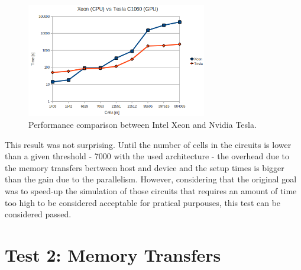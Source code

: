 \begin{figure}[h!bt]
	\centerline{\includegraphics[width=0.7\textwidth]{img/XeonVsTesla.png}}
	\caption{Performance comparison between Intel Xeon and Nvidia Tesla.}
	\label{fig:NvidiaGPUsLogicalOrg}
\end{figure}

This result was not surprising. Until the number of cells in the circuits is lower than a given threshold - 7000 with the used architecture - the overhead due to the memory transfers bertween host and device and the setup times is bigger than the gain due to the parallelism. However, considering that the original goal was to speed-up the simulation of those circuits that requires an amount of time too high to be considered acceptable for pratical purpouses, this test can be considered passed.

\section{Test 2: Memory Transfers}

